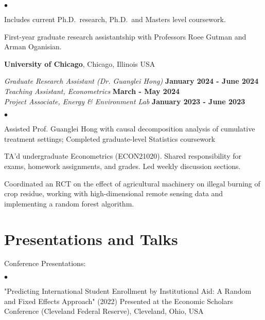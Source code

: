 \documentclass[margin,line]{res}
\newenvironment{list2}{
  \begin{list}{$\bullet$}{%
      \setlength{\itemsep}{0in}
      \setlength{\parsep}{0in} \setlength{\parskip}{0in}
      \setlength{\topsep}{0in} \setlength{\partopsep}{0in} 
      \setlength{\leftmargin}{0.2in}}}{\end{list}}
\begin{document}
\begin{resume}
\begin{list2}
\item Includes current Ph.D.~research, Ph.D.~and Masters level coursework. 
\item First-year graduate research assistantship with Professors Roee Gutman and Arman Oganisian.
\end{list2}

{\bf University of Chicago}, Chicago, Illinois USA

\vspace{-.3cm}
{\em Graduate Research Assistant (Dr. Guanglei Hong)} \hfill {\bf January 2024 - June 2024}\\
{\em Teaching Assistant, Econometrics} \hfill {\bf March - May 2024}\\
{\em Project Associate, Energy \& Environment Lab} \hfill {\bf January 2023 - June 2023}\\

\begin{list2}
\item Assisted Prof. Guanglei Hong with causal decomposition analysis of cumulative treatment settings; Completed graduate-level Statistics coursework
\item TA'd undergraduate Econometrics (ECON21020). Shared responsibility for exams, homework assignments, and grades. Led weekly discussion sections.  
\item Coordinated an RCT on the effect of agricultural machinery on illegal burning of crop residue, working with high-dimensional remote sensing data and implementing a random forest algorithm.  
\end{list2}



\section{\sc Presentations and Talks}
Conference Presentations:
\begin{list2}
\item "Predicting International Student Enrollment by Institutional Aid: A Random and Fixed Effects Approach" (2022) Presented at the Economic Scholars Conference (Cleveland Federal Reserve), Cleveland, Ohio, USA
\end{list2}


\end{resume}
\end{document}
